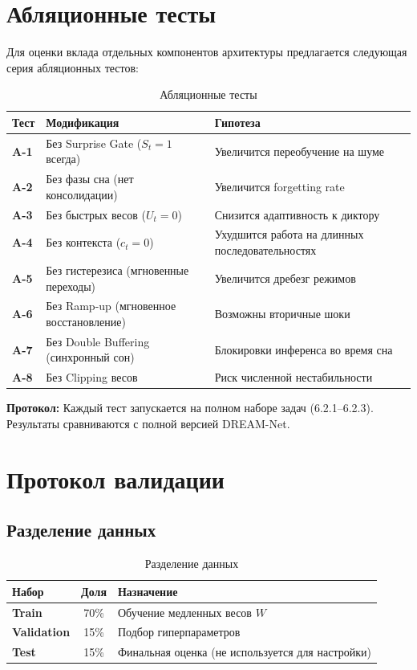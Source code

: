 \section{Абляционные тесты}

Для оценки вклада отдельных компонентов архитектуры предлагается следующая серия абляционных тестов:

\begin{table}[h]
\centering
\caption{Абляционные тесты}
\label{tab:ablation}
\begin{tabular}{lp{5cm}p{5cm}}
\toprule
\textbf{Тест} & \textbf{Модификация} & \textbf{Гипотеза} \\
\midrule
\textbf{A-1} & Без Surprise Gate ($S_t = 1$ всегда) & Увеличится переобучение на шуме \\
\textbf{A-2} & Без фазы сна (нет консолидации) & Увеличится forgetting rate \\
\textbf{A-3} & Без быстрых весов ($U_t = 0$) & Снизится адаптивность к диктору \\
\textbf{A-4} & Без контекста ($c_t = 0$) & Ухудшится работа на длинных последовательностях \\
\textbf{A-5} & Без гистерезиса (мгновенные переходы) & Увеличится дребезг режимов \\
\textbf{A-6} & Без Ramp-up (мгновенное восстановление) & Возможны вторичные шоки \\
\textbf{A-7} & Без Double Buffering (синхронный сон) & Блокировки инференса во время сна \\
\textbf{A-8} & Без Clipping весов & Риск численной нестабильности \\
\bottomrule
\end{tabular}
\end{table}

\textbf{Протокол:} Каждый тест запускается на полном наборе задач (6.2.1–6.2.3). Результаты сравниваются с полной версией DREAM-Net.

\section{Протокол валидации}

\subsection{Разделение данных}

\begin{table}[h]
\centering
\caption{Разделение данных}
\label{tab:data_split}
\begin{tabular}{lcp{6cm}}
\toprule
\textbf{Набор} & \textbf{Доля} & \textbf{Назначение} \\
\midrule
\textbf{Train} & 70\% & Обучение медленных весов $W$ \\
\textbf{Validation} & 15\% & Подбор гиперпараметров \\
\textbf{Test} & 15\% & Финальная оценка (не используется для настройки) \\
\bottomrule
\end{tabular}
\end{table}


